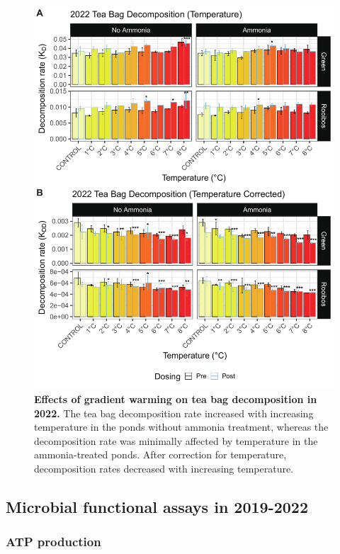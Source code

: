 \begin{figure}[H]
    \centering
    \includegraphics[scale=0.55]{./Figures/Tea2022_Temp_bar}
    \caption{\textbf{Effects of gradient warming on tea bag decomposition in 2022.} The tea bag decomposition rate increased with increasing temperature in the ponds without ammonia treatment, whereas the decomposition rate was minimally affected by temperature in the ammonia-treated ponds. After correction for temperature, decomposition rates decreased with increasing temperature.}
    \label{fig:Tea2022tcp}
\end{figure}

\subsection{Microbial functional assays in 2019-2022}\label{section:3YearS}

\subsubsection{ATP production}

